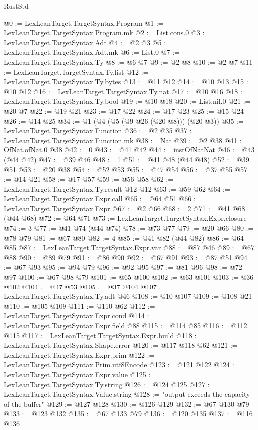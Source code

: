 \begin{lexlean}{RustStd}
\begin{coremodule}
@0 := LexLeanTarget.TargetSyntax.Program
@1 := LexLeanTarget.TargetSyntax.Program.mk
@2 := List.cons.{0}
@3 := LexLeanTarget.TargetSyntax.Adt
@4 := @2 @3
@5 := LexLeanTarget.TargetSyntax.Adt.mk
@6 := List.{0}
@7 := LexLeanTarget.TargetSyntax.Ty
@8 := @6 @7
@9 := @2 @8
@10 := @2 @7
@11 := LexLeanTarget.TargetSyntax.Ty.list
@12 := LexLeanTarget.TargetSyntax.Ty.bytes
@13 := @11 @12
@14 := @10 @13
@15 := @10 @12
@16 := LexLeanTarget.TargetSyntax.Ty.nat
@17 := @10 @16
@18 := LexLeanTarget.TargetSyntax.Ty.bool
@19 := @10 @18
@20 := List.nil.{0}
@21 := @20 @7
@22 := @19 @21
@23 := @17 @22
@24 := @17 @23
@25 := @15 @24
@26 := @14 @25
@34 := @1 (@4 (@5 (@9 @26 (@20 @8))) (@20 @3))
@35 := LexLeanTarget.TargetSyntax.Function
@36 := @2 @35
@37 := LexLeanTarget.TargetSyntax.Function.mk
@38 := Nat
@39 := @2 @38
@41 := OfNat.ofNat.{0} @38
@42 := 0
@43 := @41 @42
@44 := instOfNatNat
@46 := @43 (@44 @42)
@47 := @39 @46
@48 := 1
@51 := @41 @48 (@44 @48)
@52 := @39 @51
@53 := @20 @38
@54 := @52 @53
@55 := @47 @54
@56 := @37 @55
@57 := @14 @21
@58 := @17 @57
@59 := @56 @58
@62 := LexLeanTarget.TargetSyntax.Ty.result @12 @12
@63 := @59 @62
@64 := LexLeanTarget.TargetSyntax.Expr.call
@65 := @64 @51
@66 := LexLeanTarget.TargetSyntax.Expr
@67 := @2 @66
@68 := 2
@71 := @41 @68 (@44 @68)
@72 := @64 @71
@73 := LexLeanTarget.TargetSyntax.Expr.closure
@74 := 3
@77 := @41 @74 (@44 @74)
@78 := @73 @77
@79 := @20 @66
@80 := @78 @79
@81 := @67 @80
@82 := 4
@85 := @41 @82 (@44 @82)
@86 := @64 @85
@87 := LexLeanTarget.TargetSyntax.Expr.var
@88 := @87 @46
@89 := @67 @88
@90 := @89 @79
@91 := @86 @90
@92 := @67 @91
@93 := @87 @51
@94 := @67 @93
@95 := @94 @79
@96 := @92 @95
@97 := @81 @96
@98 := @72 @97
@100 := @67 @98 @79
@101 := @65 @100
@102 := @63 @101
@103 := @36 @102
@104 := @47 @53
@105 := @37 @104
@107 := LexLeanTarget.TargetSyntax.Ty.adt @46
@108 := @10 @107
@109 := @108 @21
@110 := @105 @109
@111 := @110 @62
@112 := LexLeanTarget.TargetSyntax.Expr.cond
@114 := LexLeanTarget.TargetSyntax.Expr.field @88
@115 := @114 @85
@116 := @112 @115
@117 := LexLeanTarget.TargetSyntax.Expr.build
@118 := LexLeanTarget.TargetSyntax.Shape.error
@120 := @117 @118 @62
@121 := LexLeanTarget.TargetSyntax.Expr.prim
@122 := LexLeanTarget.TargetSyntax.Prim.utf8Encode
@123 := @121 @122
@124 := LexLeanTarget.TargetSyntax.Expr.value
@125 := LexLeanTarget.TargetSyntax.Ty.string
@126 := @124 @125
@127 := LexLeanTarget.TargetSyntax.Value.string
@128 := "output exceeds the capacity of the buffer"
@129 := @127 @128
@130 := @126 @129
@132 := @67 @130 @79
@133 := @123 @132
@135 := @67 @133 @79
@136 := @120 @135
@137 := @116 @136

\end{coremodule}
\end{lexlean}
